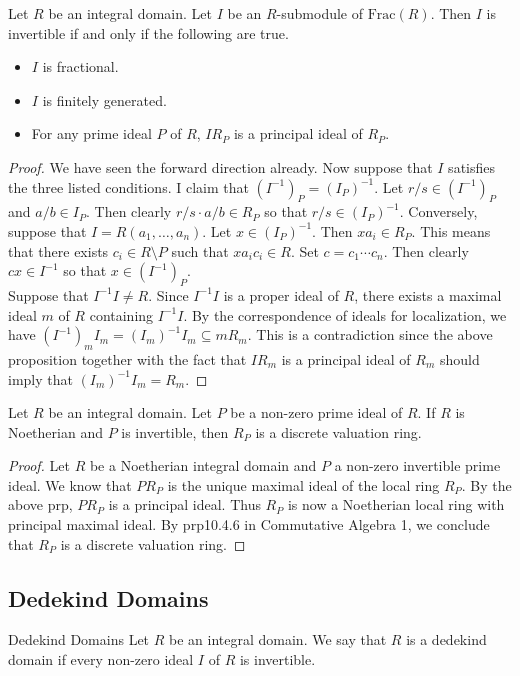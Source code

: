 \documentclass[a4paper]{article}
\begin{document}
\begin{prp}{}{} Let $R$ be an integral domain. Let $I$ be an $R$-submodule of $\text{Frac}(R)$. Then $I$ is invertible if and only if the following are true. 
\begin{itemize}
\item $I$ is fractional. 
\item $I$ is finitely generated. 
\item For any prime ideal $P$ of $R$, $IR_P$ is a principal ideal of $R_P$. 
\end{itemize} 
\begin{proof}
We have seen the forward direction already. Now suppose that $I$ satisfies the three listed conditions. I claim that $(I^{-1})_P=(I_P)^{-1}$. Let $r/s\in(I^{-1})_P$ and $a/b\in I_P$. Then clearly $r/s\cdot a/b\in R_P$ so that $r/s\in (I_P)^{-1}$. Conversely, suppose that $I=R(a_1,\dots,a_n)$. Let $x\in (I_P)^{-1}$. Then $xa_i\in R_P$. This means that there exists $c_i\in R\setminus P$ such that $xa_ic_i\in R$. Set $c=c_1\cdots c_n$. Then clearly $cx\in I^{-1}$ so that $x\in (I^{-1})_P$. \\

Suppose that $I^{-1}I\neq R$. Since $I^{-1}I$ is a proper ideal of $R$, there exists a maximal ideal $m$ of $R$ containing $I^{-1}I$. By the correspondence of ideals for localization, we have $(I^{-1})_mI_m=(I_m)^{-1}I_m\subseteq mR_m$. This is a contradiction since the above proposition together with the fact that $IR_m$ is a principal ideal of $R_m$ should imply that $(I_m)^{-1}I_m=R_m$. 
\end{proof}
\end{prp}

\begin{prp}{}{} Let $R$ be an integral domain. Let $P$ be a non-zero prime ideal of $R$. If $R$ is Noetherian and $P$ is invertible, then $R_P$ is a discrete valuation ring. 
\begin{proof}
Let $R$ be a Noetherian integral domain and $P$ a non-zero invertible prime ideal. We know that $PR_P$ is the unique maximal ideal of the local ring $R_P$. By the above prp, $PR_P$ is a principal ideal. Thus $R_P$ is now a Noetherian local ring with principal maximal ideal. By prp10.4.6 in Commutative Algebra 1, we conclude that $R_P$ is a discrete valuation ring. 
\end{proof}
\end{prp}

\subsection{Dedekind Domains}
\begin{defn}{Dedekind Domains}{} Let $R$ be an integral domain. We say that $R$ is a dedekind domain if every non-zero ideal $I$ of $R$ is invertible. 
\end{defn}
\end{document}
